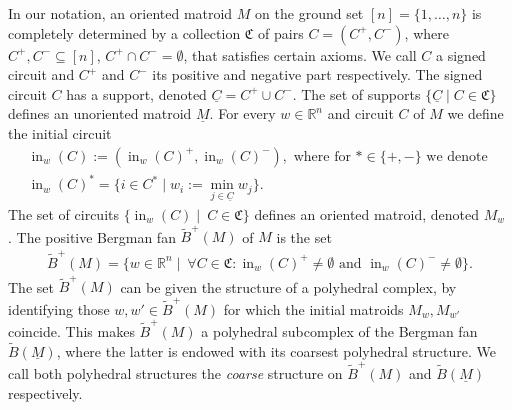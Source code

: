 \documentclass{article}
\theoremstyle{definition}
\newcommand{\R}{\mathbb{R}}
\newcommand{\inw}{\operatorname{in}_w}
\begin{document}
In our notation, an oriented matroid $M$ on the ground set $[n] = \{1, \dots, n\}$ is completely determined by a 
collection $\mathfrak{C}$ of pairs $C = (C^+, C^-)$, where $C^+, C^- \subseteq [n]$, $C^+ \cap C^- = \emptyset$, that satisfies certain axioms.
We call $C$ a signed circuit and $C^+$ and $ C^-$ its positive and negative part respectively.
The signed circuit $C$ has a support, denoted $\underline{C} = C^+ \cup C^-$.
The set of supports $\{\underline{C} \mid C \in \mathfrak{C}\}$ defines an unoriented matroid $\underline{M}$.
For every $w \in \R^n$ and circuit $C$ of $M$ we define the initial circuit
\begin{gather*}
    \inw(C) := (\inw(C)^+, \inw(C)^- ), \text{ where for } *\in \{+,-\} \text{ we denote }\\\inw(C)^* = \{ i \in C^* \mid w_i := \min_{j \in \underline{C}} w_j\}.
\end{gather*}
The set of circuits $\{\inw(C) \mid \ C \in \mathfrak{C}\}$ defines  an oriented matroid, denoted $M_w$ \cite[Proposition 2.3]{ARDILA2006577}.
The positive Bergman fan $\widetilde{B}^+(M)$ of $M$ is the set 
\begin{align*}
    \widetilde{B}^+(M) =\big\{ w \in \R^n \mid \ \forall C\in \mathfrak{C}\colon 
 \inw(C)^+ \neq \emptyset \text{ and } \inw(C)^- \neq \emptyset\big\}.
\end{align*}
The set $\widetilde{B}^+(M)$ can be given the structure of a polyhedral complex,  by identifying those $w, w' \in \widetilde{B}^+(M)$
for which the initial matroids $M_w, M_{w'}$ coincide.
This makes $\widetilde{B}^+(M)$ a polyhedral subcomplex of the Bergman fan
$\widetilde{B}(\underline{M})$, where the latter is endowed with its coarsest polyhedral structure. We call both polyhedral structures the \emph{coarse} structure on $\widetilde{B}^+(M)$ and $\widetilde{B}(\underline{M})$ respectively.
\end{document}
